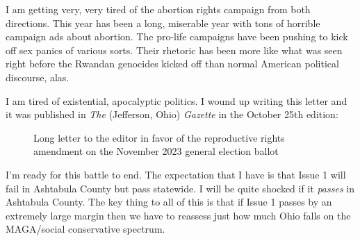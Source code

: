 I am getting very, very tired of the abortion rights campaign from both
directions. This year has been a long, miserable year with tons of
horrible campaign ads about abortion. The pro-life campaigns have been
pushing to kick off sex panics of various sorts. Their rhetoric has been
more like what was seen right before the Rwandan genocides kicked off
than normal American political discourse, alas.

I am tired of existential, apocalyptic politics. I wound up writing this
letter and it was published in \emph{The} (Jefferson, Ohio)
\emph{Gazette} in the October 25th edition:

\begin{figure}
\centering
{}
\caption{Long letter to the editor in favor of the reproductive rights
amendment on the November 2023 general election ballot}
\end{figure}

I'm ready for this battle to end. The expectation that I have is that
Issue 1 will fail in Ashtabula County but pass statewide. I will be
quite shocked if it \emph{passes} in Ashtabula County. The key thing to
all of this is that if Issue 1 passes by an extremely large margin then
we have to reassess just how much Ohio falls on the MAGA/social
conservative spectrum.
